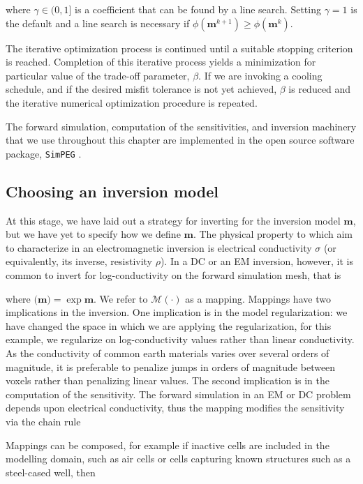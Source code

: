 
where $\gamma \in (0,1]$ is a coefficient that can be found by a line search.
Setting $\gamma=1$ is the default and a line search is necessary if $\phi(\mathbf{m}^{k+1}) \ge \phi(\mathbf{m}^{k})$.

The iterative optimization process is continued until a suitable stopping criterion is reached.
Completion of this iterative process yields a minimization for particular value of the trade-off parameter, $\beta$. If we are invoking a cooling schedule, and if the desired misfit tolerance is not yet achieved, $\beta$ is reduced and the iterative numerical optimization procedure is repeated.

The forward simulation, computation of the sensitivities, and inversion machinery that we use throughout this chapter are implemented in the open source software package, \texttt{SimPEG} \citep{Cockett2015, Heagy2017}.
\subsection{Choosing an inversion model}
At this stage, we have laid out a strategy for inverting for the inversion model $\mathbf{m}$, but we have yet to specify how we define $\mathbf{m}$. The physical property to which aim to characterize in an electromagnetic inversion is electrical conductivity $\sigma$ (or equivalently, its inverse, resistivity $\rho$). In a DC or an EM inversion, however, it is common to invert for log-conductivity on the forward simulation mesh, that is


where $\mathcal(\mathbf{m}) = \exp{\mathbf{m}}$. We refer to $\mathcal{M}(\cdot)$ as a mapping. Mappings have two implications in the inversion. One implication is in the model regularization: we have changed the space in which we are applying the regularization, for this example, we regularize on log-conductivity values rather than linear conductivity. As the conductivity of common earth materials varies over several orders of magnitude, it is preferable to penalize jumps in orders of magnitude between voxels rather than penalizing linear values. The second implication is in the computation of the sensitivity. The forward simulation in an EM or DC problem depends upon electrical conductivity, thus the mapping modifies the sensitivity via the chain rule



Mappings can be composed, for example if inactive cells are included in the modelling domain, such as air cells or cells capturing known structures such as a steel-cased well, then

